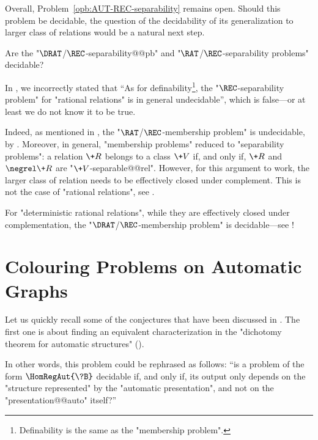 Overall, Problem~\ref{opb:AUT-REC-separability} remains open.
Should this problem be decidable, the question of
the decidability of its generalization to larger class of relations would be
a natural next step.

\begin{openproblem}
	Are the "$\DRAT$/$\REC$-separability@@pb" and
	"$\RAT$/$\REC$-separability problems" decidable?
\end{openproblem}

In \cite[\S~1]{BarceloFigueiraMorvan2023SeparatingAutomatic},
we incorrectly stated that ``As for definability\footnote{Definability is the same
as the "membership problem".}, the "$\REC$-separability problem" for "rational relations" is in general undecidable'', which is false---or at least we do not know it to be true.

Indeed, as mentioned in ,
the "$\RAT$/$\REC$-membership problem" is undecidable, by
\cite[\S~III, Theorem~8.4]{Berstel1979Transductions}.
Moreover, in general, "membership problems" reduced to "separability problems":
a relation $\+R$ belongs to a class $\+V$ if, and only if, $\+R$ and $\negrel \+R$
are "$\+V$-separable@@rel". However, for this argument to work, the larger class of relation
needs to be effectively closed under complement.
This is not the case of "rational relations", see .

For "deterministic rational relations", while they are effectively
closed under complementation, the "$\DRAT$/$\REC$-membership problem"
is decidable---see !

\section{Colouring Problems on Automatic Graphs}

Let us quickly recall some of the conjectures that have been discussed in .
The first one is about finding an equivalent characterization in the "dichotomy theorem
for automatic structures" ().

\conjInvarianceGraphIsomorphisms*

In other words, this problem could be rephrased as follows: ``is a problem
of the form $\HomRegAut{\?B}$ decidable if, and only if, its output
only depends on the "structure represented" by the "automatic presentation",
and not on the "presentation@@auto" itself?''

